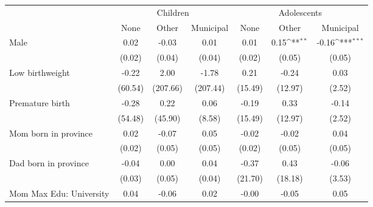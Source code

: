 {
\def\sym#1{\ifmmode^{#1}\else\(^{#1}\)\fi}
\begin{tabular}{l*{6}{c}}
\toprule
& \multicolumn{3}{c}{Children} & \multicolumn{3}{c}{Adolescents} \\
                    &\multicolumn{1}{c}{None}&\multicolumn{1}{c}{Other}&\multicolumn{1}{c}{Municipal}&\multicolumn{1}{c}{None}&\multicolumn{1}{c}{Other}&\multicolumn{1}{c}{Municipal}\\
\midrule
Male                &        0.02         &       -0.03         &        0.01         &        0.01         &        0.15\sym{**} &       -0.16\sym{***}\\
                    &      (0.02)         &      (0.04)         &      (0.04)         &      (0.02)         &      (0.05)         &      (0.05)         \\
\addlinespace
Low birthweight     &       -0.22         &        2.00         &       -1.78         &        0.21         &       -0.24         &        0.03         \\
                    &     (60.54)         &    (207.66)         &    (207.44)         &     (15.49)         &     (12.97)         &      (2.52)         \\
\addlinespace
Premature birth     &       -0.28         &        0.22         &        0.06         &       -0.19         &        0.33         &       -0.14         \\
                    &     (54.48)         &     (45.90)         &      (8.58)         &     (15.49)         &     (12.97)         &      (2.52)         \\
\addlinespace
Mom born in province&        0.02         &       -0.07         &        0.05         &       -0.02         &       -0.02         &        0.04         \\
                    &      (0.02)         &      (0.05)         &      (0.05)         &      (0.02)         &      (0.05)         &      (0.05)         \\
\addlinespace
Dad born in province&       -0.04         &        0.00         &        0.04         &       -0.37         &        0.43         &       -0.06         \\
                    &      (0.03)         &      (0.05)         &      (0.04)         &     (21.70)         &     (18.18)         &      (3.53)         \\
\addlinespace
Mom Max Edu: University&        0.04         &       -0.06         &        0.02         &       -0.00         &       -0.05         &        0.05         \\

\end{tabular}}
